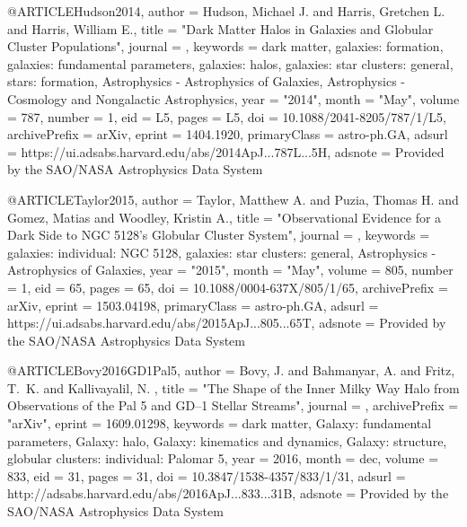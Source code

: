 \documentclass[apj]{emulateapj}
\begin{document}
{{{{{{{{{{{{{{@ARTICLE{Hudson2014,
       author = {{Hudson}, Michael J. and {Harris}, Gretchen L. and {Harris}, William E.},
        title = "{Dark Matter Halos in Galaxies and Globular Cluster Populations}",
      journal = {\apjl},
     keywords = {dark matter, galaxies: formation, galaxies: fundamental parameters, galaxies: halos, galaxies: star clusters: general, stars: formation, Astrophysics - Astrophysics of Galaxies, Astrophysics - Cosmology and Nongalactic Astrophysics},
         year = "2014",
        month = "May",
       volume = {787},
       number = {1},
          eid = {L5},
        pages = {L5},
          doi = {10.1088/2041-8205/787/1/L5},
archivePrefix = {arXiv},
       eprint = {1404.1920},
 primaryClass = {astro-ph.GA},
       adsurl = {https://ui.adsabs.harvard.edu/abs/2014ApJ...787L...5H},
      adsnote = {Provided by the SAO/NASA Astrophysics Data System}
}


@ARTICLE{Taylor2015,
       author = {{Taylor}, Matthew A. and {Puzia}, Thomas H. and {Gomez}, Matias and
         {Woodley}, Kristin A.},
        title = "{Observational Evidence for a Dark Side to NGC 5128's Globular Cluster System}",
      journal = {\apj},
     keywords = {galaxies: individual: NGC 5128, galaxies: star clusters: general, Astrophysics - Astrophysics of Galaxies},
         year = "2015",
        month = "May",
       volume = {805},
       number = {1},
          eid = {65},
        pages = {65},
          doi = {10.1088/0004-637X/805/1/65},
archivePrefix = {arXiv},
       eprint = {1503.04198},
 primaryClass = {astro-ph.GA},
       adsurl = {https://ui.adsabs.harvard.edu/abs/2015ApJ...805...65T},
      adsnote = {Provided by the SAO/NASA Astrophysics Data System}
}




@ARTICLE{Bovy2016GD1Pal5,
   author = {{Bovy}, J. and {Bahmanyar}, A. and {Fritz}, T.~K. and {Kallivayalil}, N.
	},
    title = "{The Shape of the Inner Milky Way Halo from Observations of the Pal 5 and GD--1 Stellar Streams}",
  journal = {\apj},
archivePrefix = "arXiv",
   eprint = {1609.01298},
 keywords = {dark matter, Galaxy: fundamental parameters, Galaxy: halo, Galaxy: kinematics and dynamics, Galaxy: structure, globular clusters: individual: Palomar 5},
     year = 2016,
    month = dec,
   volume = 833,
      eid = {31},
    pages = {31},
      doi = {10.3847/1538-4357/833/1/31},
   adsurl = {http://adsabs.harvard.edu/abs/2016ApJ...833...31B},
  adsnote = {Provided by the SAO/NASA Astrophysics Data System}
}



}}}}}}}}}}}}}}
\end{document}
